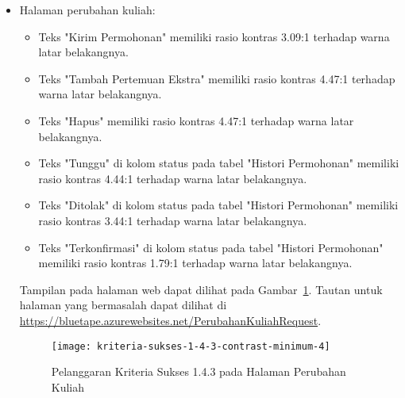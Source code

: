 \begin{itemize}
    \item Halaman perubahan kuliah: 
    \begin{itemize}
        \item Teks "Kirim Permohonan" memiliki rasio kontras 3.09:1 terhadap warna latar belakangnya.
        \item Teks "Tambah Pertemuan Ekstra" memiliki rasio kontras 4.47:1 terhadap warna latar belakangnya.
        \item Teks "Hapus" memiliki rasio kontras 4.47:1 terhadap warna latar belakangnya.
        \item Teks "Tunggu" di kolom status pada tabel "Histori Permohonan" memiliki rasio kontras 4.44:1 terhadap warna latar belakangnya.
        \item Teks "Ditolak" di kolom status pada tabel "Histori Permohonan" memiliki rasio kontras 3.44:1 terhadap warna latar belakangnya.
        \item Teks "Terkonfirmasi" di kolom status pada tabel "Histori Permohonan" memiliki rasio kontras 1.79:1 terhadap warna latar belakangnya.
    \end{itemize}
    Tampilan pada halaman web dapat dilihat pada \mbox{Gambar \ref{fig:1.4.3_contrast_minimum_4}}. Tautan untuk halaman yang bermasalah dapat dilihat di \url{https://bluetape.azurewebsites.net/PerubahanKuliahRequest}.
    \begin{figure}[H]
        \centering  
        \texttt{[image: kriteria-sukses-1-4-3-contrast-minimum-4]}  
        \caption[Pelanggaran Kriteria Sukses 1.4.3 pada Halaman Perubahan Kuliah]{Pelanggaran Kriteria Sukses 1.4.3 pada Halaman Perubahan Kuliah}
        \label{fig:1.4.3_contrast_minimum_4}  
    \end{figure} 
    

\end{itemize}
